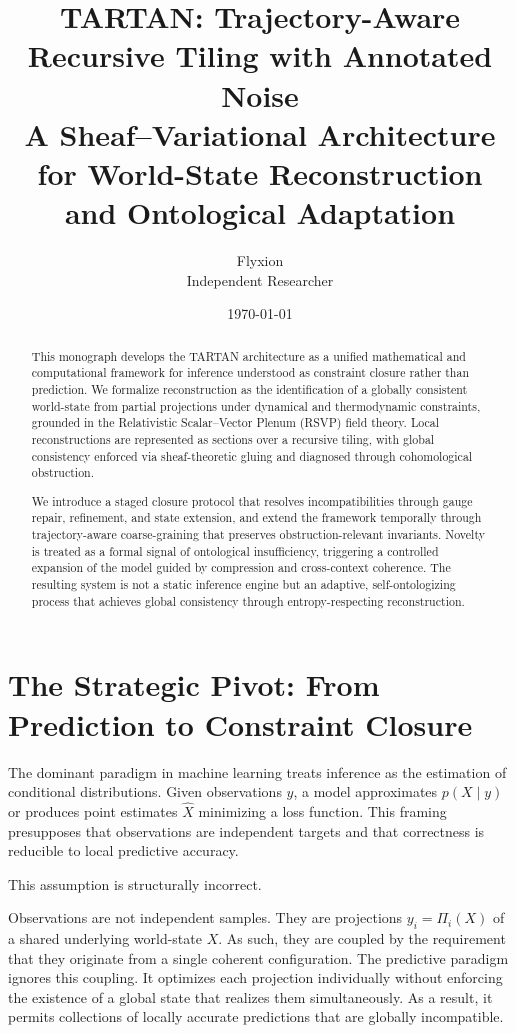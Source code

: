 \documentclass[12pt, oneside]{article}
\title{\textbf{TARTAN: Trajectory-Aware Recursive Tiling with Annotated Noise} \\[0.5em]
\large A Sheaf--Variational Architecture for World-State Reconstruction and Ontological Adaptation}
\author{Flyxion \\[0.3em]
\normalsize Independent Researcher}
\date{\today}
\begin{document}
\maketitle

\begin{abstract}
This monograph develops the TARTAN architecture as a unified mathematical and computational framework for inference understood as constraint closure rather than prediction. We formalize reconstruction as the identification of a globally consistent world-state from partial projections under dynamical and thermodynamic constraints, grounded in the Relativistic Scalar--Vector Plenum (RSVP) field theory. Local reconstructions are represented as sections over a recursive tiling, with global consistency enforced via sheaf-theoretic gluing and diagnosed through cohomological obstruction.

We introduce a staged closure protocol that resolves incompatibilities through gauge repair, refinement, and state extension, and extend the framework temporally through trajectory-aware coarse-graining that preserves obstruction-relevant invariants. Novelty is treated as a formal signal of ontological insufficiency, triggering a controlled expansion of the model guided by compression and cross-context coherence. The resulting system is not a static inference engine but an adaptive, self-ontologizing process that achieves global consistency through entropy-respecting reconstruction.
\end{abstract}

\newpage
\tableofcontents
\newpage

\section{The Strategic Pivot: From Prediction to Constraint Closure}

The dominant paradigm in machine learning treats inference as the estimation of conditional distributions. Given observations $y$, a model approximates $p(X \mid y)$ or produces point estimates $\hat{X}$ minimizing a loss function. This framing presupposes that observations are independent targets and that correctness is reducible to local predictive accuracy.

This assumption is structurally incorrect.

Observations are not independent samples. They are projections $y_i = \Pi_i(X)$ of a shared underlying world-state $X$. As such, they are coupled by the requirement that they originate from a single coherent configuration. The predictive paradigm ignores this coupling. It optimizes each projection individually without enforcing the existence of a global state that realizes them simultaneously. As a result, it permits collections of locally accurate predictions that are globally incompatible.
\end{document}
